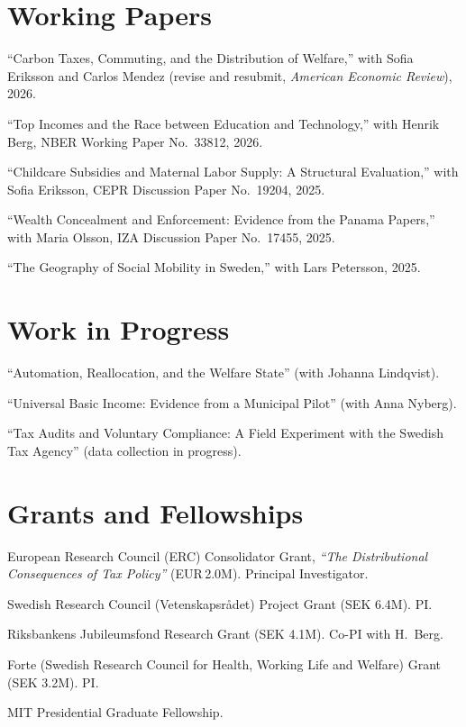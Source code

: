 \documentclass[11pt]{article}
\newcommand{\dated}[2]{%
  \noindent\makebox[5.2em][l]{\textcolor{mutedgray}{#1}}%
  \begin{minipage}[t]{\dimexpr\linewidth-5.4em\relax}#2\end{minipage}\par\vspace{3pt}}
\newcommand{\pubitem}[1]{\item #1}
\begin{document}
\section{Working Papers}
\begin{cvlist}
\pubitem{``Carbon Taxes, Commuting, and the Distribution of Welfare,'' with Sofia Eriksson and Carlos Mendez (revise and resubmit, \emph{American Economic Review}), 2026.}
\pubitem{``Top Incomes and the Race between Education and Technology,'' with Henrik Berg, NBER Working Paper No.\ 33812, 2026.}
\pubitem{``Childcare Subsidies and Maternal Labor Supply: A Structural Evaluation,'' with Sofia Eriksson, CEPR Discussion Paper No.\ 19204, 2025.}
\pubitem{``Wealth Concealment and Enforcement: Evidence from the Panama Papers,'' with Maria Olsson, IZA Discussion Paper No.\ 17455, 2025.}
\pubitem{``The Geography of Social Mobility in Sweden,'' with Lars Petersson, 2025.}
\end{cvlist}

\section{Work in Progress}
\begin{cvlist}
\pubitem{``Automation, Reallocation, and the Welfare State'' (with Johanna Lindqvist).}
\pubitem{``Universal Basic Income: Evidence from a Municipal Pilot'' (with Anna Nyberg).}
\pubitem{``Tax Audits and Voluntary Compliance: A Field Experiment with the Swedish Tax Agency'' (data collection in progress).}
\end{cvlist}

\section{Grants and Fellowships}
\dated{2024--29}{European Research Council (ERC) Consolidator Grant, \emph{``The Distributional Consequences of Tax Policy''} (EUR\,2.0M). Principal Investigator.}
\dated{2022--26}{Swedish Research Council (Vetenskapsr\aa det) Project Grant (SEK 6.4M). PI.}
\dated{2020--23}{Riksbankens Jubileumsfond Research Grant (SEK 4.1M). Co-PI with H.\ Berg.}
\dated{2018--21}{Forte (Swedish Research Council for Health, Working Life and Welfare) Grant (SEK 3.2M). PI.}
\dated{2010--11}{MIT Presidential Graduate Fellowship.}
\end{document}

